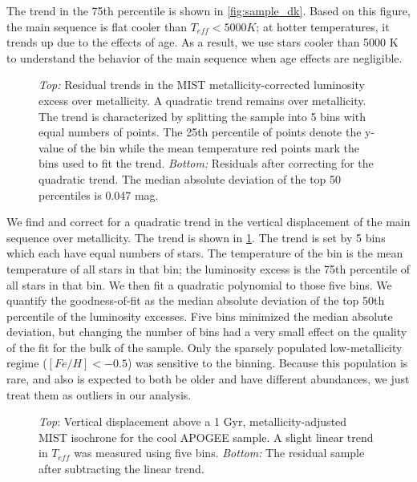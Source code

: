 \documentclass[manuscript]{aastex6}
\newcommand{\Teff}{\ensuremath{T_{eff}}}
\begin{document}
The trend in the 75th percentile is shown in \cref{fig:sample_dk}. Based on 
this figure, the main sequence is flat cooler than \(\Teff < 5000 K\); at
hotter temperatures, it trends up due to the effects of age. As a result, we 
use stars cooler than 5000 K to understand the behavior of the main sequence 
when age effects are negligible.

\begin{figure}[htb]
    \centering
    \caption{\emph{Top:} Residual trends in the MIST metallicity-corrected luminosity 
    excess over metallicity. A quadratic trend remains over metallicity. The
    trend is characterized by splitting the sample into 5 bins with equal
    numbers of points.  The 25th percentile of points denote the y-value of the
    bin while the mean temperature red points mark the bins used to fit the trend. \emph{Bottom:} Residuals after
correcting for the quadratic trend. The median absolute deviation of the top 50
percentiles is 0.047 mag.}
    \label{fig:met_trend}
\end{figure}

We find and correct for a quadratic trend in the vertical displacement of the
main sequence over metallicity. The trend is shown in \cref{fig:met_trend}.
The trend is set by 5 bins which each have equal numbers of stars. The
temperature of the bin is the mean temperature of all stars in that bin; the
luminosity excess is the 75th percentile of all stars in that bin. We then fit
a quadratic polynomial to those five bins. We quantify the goodness-of-fit as
the median absolute deviation of the top 50th percentile of the luminosity
excesses. Five bins minimized the median absolute deviation, but changing the
number of bins had a very small effect on the quality of the fit for the bulk
of the sample. Only the sparsely populated low-metallicity regime (\([Fe/H] <
-0.5\)) was sensitive to the binning. Because this population is rare, and also
is expected to both be older and have different abundances, we just treat them
as outliers in our analysis.

\begin{figure}[htb]
    \centering
    \caption{\emph{Top}: Vertical displacement above a 1 Gyr,
        metallicity-adjusted MIST isochrone for the cool APOGEE sample. A 
        slight linear trend in \Teff{} was measured using five bins. 
        \emph{Bottom:} The residual sample after subtracting the linear 
    trend.}
    \label{fig:apogee_teff_trend}
\end{figure}
\end{document}
